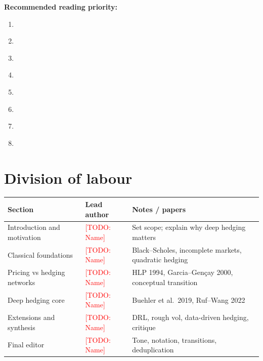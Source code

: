 \documentclass[12pt, a4paper]{article}
\newcommand{\TODO}[1]{\textcolor{red}{[TODO: #1]}}
\begin{document}
\textbf{Recommended reading priority:}
\begin{enumerate}[label=\arabic*.]
    \item \citet{RufWang2020}
    \item \citet{BuehlerEtAl2019}
    \item \citet{HutchinsonLoPoggio1994}
    \item \citet{GarciaGencay2000}
    \item \citet{RufWang2022}
    \item \citet{DuEtAl2020}
    \item \citet{HorvathTeichmannZuric2021}
    \item \citet{Cont2025}
\end{enumerate}


\section*{Division of labour}
\begin{table}[h!]
\centering
\begin{tabularx}{\textwidth}{@{}l l X@{}}
\toprule
Section & Lead author & Notes / papers \\
\midrule
Introduction and motivation    & \TODO{Name} & Set scope; explain why deep hedging matters \\
Classical foundations          & \TODO{Name} & Black--Scholes, incomplete markets, quadratic hedging \\
Pricing vs hedging networks    & \TODO{Name} & HLP 1994, Garcia--Gen\c{c}ay 2000, conceptual transition \\
Deep hedging core              & \TODO{Name} & Buehler et al.\ 2019, Ruf--Wang 2022 \\
Extensions and synthesis       & \TODO{Name} & DRL, rough vol, data-driven hedging, critique \\
Final editor                   & \TODO{Name} & Tone, notation, transitions, deduplication \\
\bottomrule
\end{tabularx}
\end{table}

\tableofcontents
\newpage

\end{document}
